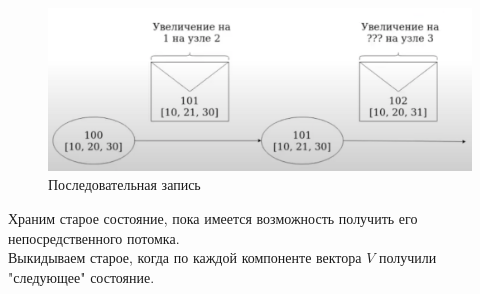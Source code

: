       \begin{figure}[h]
          \centering
          \includegraphics[scale = 0.5]{../assets/16.png}
          \caption{Последовательная запись}
      \end{figure}
      Храним старое состояние, пока имеется возможность получить его непосредственного потомка.\\
      Выкидываем старое, когда по каждой компоненте вектора $V$ получили "следующее" состояние.

